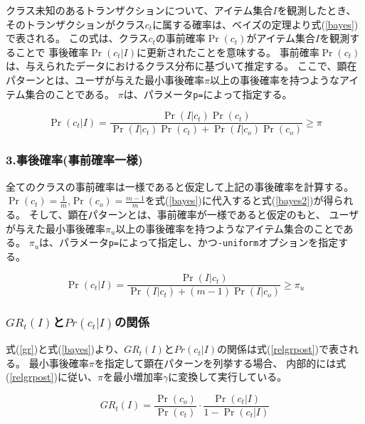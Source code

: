 クラス未知のあるトランザクションについて、アイテム集合$I$を観測したとき、
そのトランザクションがクラス$c_t$に属する確率は、ベイズの定理より式(\ref{bayes})で表される。
この式は、クラス$c_t$の事前確率$\Pr(c_t)$がアイテム集合$I$を観測することで
事後確率$\Pr(c_t|I)$に更新されたことを意味する。
事前確率$\Pr(c_t)$は、与えられたデータにおけるクラス分布に基づいて推定する。
ここで、顕在パターンとは、ユーザが与えた最小事後確率$\pi$以上の事後確率を持つようなアイテム集合のことである。
$\pi$は、パラメータ\verb|p=|によって指定する。

\begin{equation}
\Pr(c_t|I)=\frac{\Pr(I|c_t)\Pr(c_t)}{\Pr(I|c_t)\Pr(c_t)+\Pr(I|c_o)\Pr(c_o)} \ge \pi \label{bayes}
\end{equation}

\subsubsection*{3.事後確率(事前確率一様)}
全てのクラスの事前確率は一様であると仮定して上記の事後確率を計算する。
$\Pr(c_t)=\frac{1}{m}$,$\Pr(c_o)=\frac{m-1}{m}$を式(\ref{bayes})に代入すると式(\ref{bayes2})が得られる。
そして、顕在パターンとは、事前確率が一様であると仮定のもと、
ユーザが与えた最小事後確率$\pi_u$以上の事後確率を持つようなアイテム集合のことである。
$\pi_u$は、パラメータ\verb|p=|によって指定し、かつ\verb|-uniform|オプションを指定する。

\begin{equation}
\Pr(c_t|I)=\frac{\Pr(I|c_t)}{\Pr(I|c_t)+(m-1)\Pr(I|c_o)} \ge \pi_{u} \label{bayes2}
\end{equation}

\subsubsection*{$GR_t(I)$と$Pr(c_t|I)$の関係}
式(\ref{gr})と式(\ref{bayes})より、$GR_t(I)$と$Pr(c_t|I)$の関係は式(\ref{relgrpost})で表される。
最小事後確率$\pi$を指定して顕在パターンを列挙する場合、
内部的には式(\ref{relgrpost})に従い、$\pi$を最小増加率$\gamma$に変換して実行している。

\begin{equation}
GR_t(I)=\frac{\Pr(c_o)}{\Pr(c_t)}\cdot \frac{\Pr(c_t|I)}{1-\Pr(c_t|I)} \label{relgrpost}
\end{equation}


